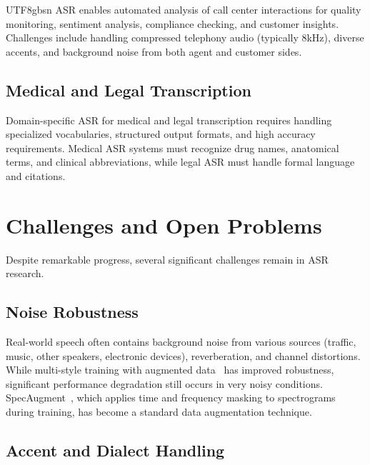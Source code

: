 \documentclass[12pt,a4paper]{article}
\begin{document}
\begin{CJK}{UTF8}{gbsn}
ASR enables automated analysis of call center interactions for quality monitoring, sentiment analysis, compliance checking, and customer insights. Challenges include handling compressed telephony audio (typically 8kHz), diverse accents, and background noise from both agent and customer sides.

\subsection{Medical and Legal Transcription}
\label{subsec:medical}

Domain-specific ASR for medical and legal transcription requires handling specialized vocabularies, structured output formats, and high accuracy requirements. Medical ASR systems must recognize drug names, anatomical terms, and clinical abbreviations, while legal ASR must handle formal language and citations.

\section{Challenges and Open Problems}
\label{sec:challenges}

Despite remarkable progress, several significant challenges remain in ASR research.

\subsection{Noise Robustness}
\label{subsec:noise}

Real-world speech often contains background noise from various sources (traffic, music, other speakers, electronic devices), reverberation, and channel distortions. While multi-style training with augmented data~\cite{ko2015audio,park2019specaugment} has improved robustness, significant performance degradation still occurs in very noisy conditions. SpecAugment~\cite{park2019specaugment}, which applies time and frequency masking to spectrograms during training, has become a standard data augmentation technique.

\subsection{Accent and Dialect Handling}
\label{subsec:accent}


\end{CJK}
\end{document}
